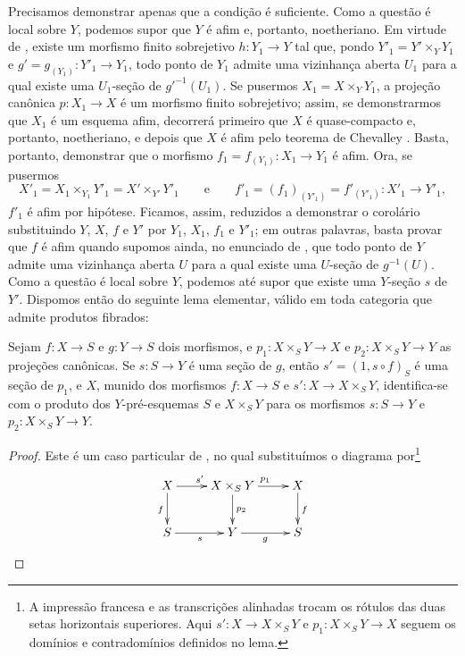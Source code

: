 Precisamos demonstrar apenas que a condição é suficiente.
Como a questão é local sobre $Y$, podemos supor que $Y$ é afim e, portanto, noetheriano.
Em virtude de , existe um morfismo finito sobrejetivo $h:Y_1\to Y$ tal que, pondo $Y'_1=Y'\times_Y Y_1$ e $g'=g_{(Y_1)}:Y'_1\to Y_1$, todo ponto de $Y_1$ admite uma vizinhança aberta $U_1$ para a qual existe uma $U_1$-seção de $g'^{-1}(U_1)$.
Se pusermos $X_1=X\times_Y Y_1$, a projeção canônica $p:X_1\to X$ é um morfismo finito sobrejetivo; assim, se demonstrarmos que $X_1$ é um esquema afim, decorrerá primeiro que $X$ é quase-compacto e, portanto, noetheriano, e depois que $X$ é afim pelo teorema de Chevalley .
Basta, portanto, demonstrar que o morfismo $f_1=f_{(Y_1)}:X_1\to Y_1$ é afim.
Ora, se pusermos
\[
  X'_1=X_1\times_{Y_1}Y'_1=X'\times_{Y'}Y'_1
  \qquad\text{e}\qquad
  f'_1=(f_1)_{(Y'_1)}=f'_{(Y'_1)}:X'_1\to Y'_1,
\]
$f'_1$ é afim por hipótese.
Ficamos, assim, reduzidos a demonstrar o corolário substituindo $Y$, $X$, $f$ e $Y'$ por $Y_1$, $X_1$, $f_1$ e $Y'_1$; em outras palavras, basta provar que $f$ é afim quando supomos ainda, no enunciado de , que todo ponto de $Y$ admite uma vizinhança aberta $U$ para a qual existe uma $U$-seção de $g^{-1}(U)$.
Como a questão é local sobre $Y$, podemos até supor que existe uma $Y$-seção $s$ de $Y'$.
Dispomos então do seguinte lema elementar, válido em toda categoria que admite produtos fibrados:

\begin{lemma}[14.5.11.1]
\label{IV.14.5.11.1}
Sejam $f:X\to S$ e $g:Y\to S$ dois morfismos, e $p_1:X\times_S Y\to X$ e $p_2:X\times_S Y\to Y$ as projeções canônicas.
Se $s:S\to Y$ é uma seção de $g$, então $s'=(1,s\circ f)_S$ é uma seção de $p_1$, e $X$, munido dos morfismos $f:X\to S$ e $s':X\to X\times_S Y$, identifica-se com o produto dos $Y$-pré-esquemas $S$ e $X\times_S Y$ para os morfismos $s:S\to Y$ e $p_2:X\times_S Y\to Y$.
\end{lemma}


\begin{proof}
Este é um caso particular de , no qual substituímos o diagrama por\footnote{A impressão francesa e as transcrições alinhadas trocam os rótulos das duas setas horizontais superiores. Aqui $s':X\to X\times_S Y$ e $p_1:X\times_S Y\to X$ seguem os domínios e contradomínios definidos no lema.}
\[
  \xymatrix{
    X \ar[r]^{s'} \ar[d]_{f} & X\times_S Y \ar[r]^{p_1} \ar[d]^{p_2} & X \ar[d]^{f} \\
    S \ar[r]_{s} & Y \ar[r]_{g} & S
  }
\]
\end{proof}


